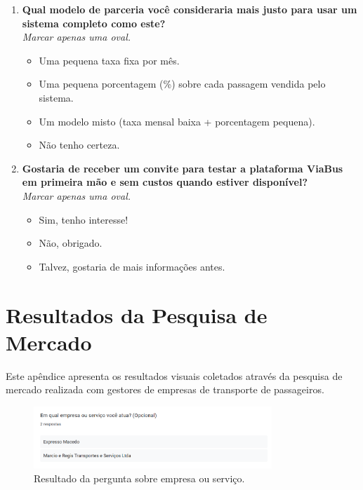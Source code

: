 \begin{apendicesenv}
\begin{enumerate}
    \item \textbf{Qual modelo de parceria você consideraria mais justo para usar um sistema completo como este?} \\
          \textit{Marcar apenas uma oval.}
          \begin{itemize}
            \item Uma pequena taxa fixa por mês.
            \item Uma pequena porcentagem (\%) sobre cada passagem vendida pelo sistema.
            \item Um modelo misto (taxa mensal baixa + porcentagem pequena).
            \item Não tenho certeza.
          \end{itemize}

    \item \textbf{Gostaria de receber um convite para testar a plataforma ViaBus em primeira mão e sem custos quando estiver disponível?} \\
          \textit{Marcar apenas uma oval.}
          \begin{itemize}
            \item Sim, tenho interesse!
            \item Não, obrigado.
            \item Talvez, gostaria de mais informações antes.
          \end{itemize}
  \end{enumerate}


  \chapter{Resultados da Pesquisa de Mercado}
  \label{apendice:resultados}

  Este apêndice apresenta os resultados visuais coletados através da pesquisa de mercado realizada com gestores de empresas de transporte de passageiros.

  \begin{figure}[htbp]
    \centering
    \includegraphics[width=0.8\textwidth]{imagens/imagem1.png}
    \caption{Resultado da pergunta sobre empresa ou serviço.}
    \label{fig:resultado1}
  \end{figure}


\end{apendicesenv}
